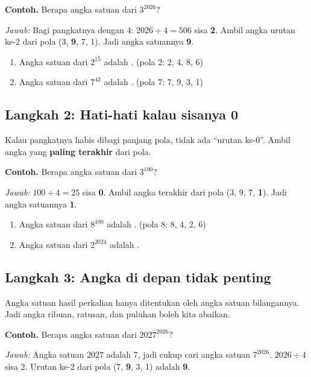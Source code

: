 \documentclass[11pt,a4paper]{article}
\begin{document}
\begin{contoh}
\textbf{Contoh.} Berapa angka satuan dari $3^{2026}$?

\textit{Jawab:} Bagi pangkatnya dengan 4: $2026 \div 4 = 506$ sisa \textbf{2}. Ambil angka
urutan ke-2 dari pola (3, \textbf{9}, 7, 1). Jadi angka satuannya \textbf{9}.
\end{contoh}

\begin{giliranmu}
\begin{enumerate}[label=\alph*.]
    \item Angka satuan dari $2^{15}$ adalah \kosong. \quad (pola 2: 2, 4, 8, 6)
    \item Angka satuan dari $7^{42}$ adalah \kosong. \quad (pola 7: 7, 9, 3, 1)
\end{enumerate}
\end{giliranmu}

\subsection*{Langkah 2: Hati-hati kalau sisanya 0}
Kalau pangkatnya habis dibagi panjang pola, tidak ada ``urutan ke-0''. Ambil angka yang
\textbf{paling terakhir} dari pola.

\begin{contoh}
\textbf{Contoh.} Berapa angka satuan dari $3^{100}$?

\textit{Jawab:} $100 \div 4 = 25$ sisa \textbf{0}. Ambil angka terakhir dari pola
(3, 9, 7, \textbf{1}). Jadi angka satuannya \textbf{1}.
\end{contoh}

\begin{giliranmu}
\begin{enumerate}[label=\alph*.]
    \item Angka satuan dari $8^{100}$ adalah \kosong. \quad (pola 8: 8, 4, 2, 6)
    \item Angka satuan dari $2^{2024}$ adalah \kosong.
\end{enumerate}
\end{giliranmu}

\subsection*{Langkah 3: Angka di depan tidak penting}
Angka satuan hasil perkalian hanya ditentukan oleh angka satuan bilangannya. Jadi angka
ribuan, ratusan, dan puluhan boleh kita abaikan.

\begin{contoh}
\textbf{Contoh.} Berapa angka satuan dari $2027^{2026}$?

\textit{Jawab:} Angka satuan 2027 adalah 7, jadi cukup cari angka satuan $7^{2026}$.
$2026 \div 4$ sisa 2. Urutan ke-2 dari pola (7, \textbf{9}, 3, 1) adalah \textbf{9}.
\end{contoh}
\end{document}
